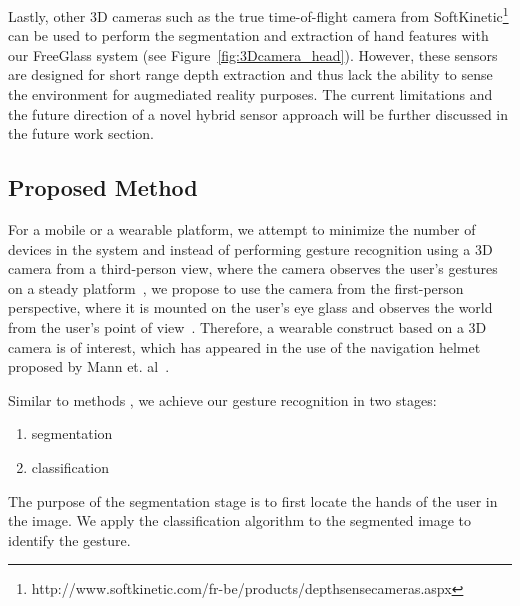 Lastly, other 3D cameras such as the true time-of-flight camera
from SoftKinetic\footnote{http://www.softkinetic.com/fr-be/products/depthsensecameras.aspx} can
be used to perform the segmentation and extraction of hand features with our
FreeGlass system (see Figure~\ref{fig:3Dcamera_head}). However, these
sensors are designed for short range depth extraction and thus lack the ability
to sense the environment for augmediated reality purposes. The current
limitations and the future direction of a novel hybrid sensor approach will
be further discussed in the future work section.

\subsection{Proposed Method}
For a mobile or a wearable platform, we attempt to minimize the number of
devices in the system and instead of performing gesture recognition
using a 3D camera from a third-person view, where the camera observes the
user's gestures on a steady platform~\cite{li2009real}, we propose to use
the camera from the first-person perspective, where it is mounted on the
user's eye glass and observes the world from the user's point of
view~\cite{mann2011blind}. Therefore, a wearable construct based on
a 3D camera is of interest, which has appeared in the use of the navigation
helmet proposed by Mann et. al~\cite{mann2011blind}.

Similar to methods \cite{li2009real, kjeldsen1996toward, ren2011robust, uebersax2011real},
we achieve our gesture recognition in two stages:
\begin{enumerate}
\item segmentation
\item classification
\end{enumerate}

The purpose of the segmentation stage is to first locate the hands of the user in the image. We apply the classification algorithm to the segmented image to identify the gesture.

